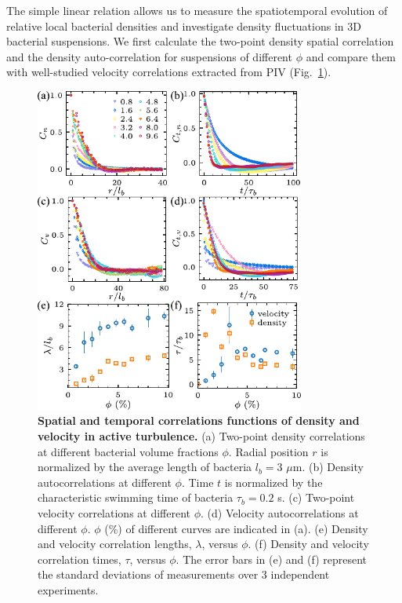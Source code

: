 The simple linear relation allows us to measure the spatiotemporal evolution of relative local bacterial densities and investigate density fluctuations in 3D bacterial suspensions. We first calculate the two-point density spatial correlation and the density auto-correlation for suspensions of different $\phi$ and compare them with well-studied velocity correlations extracted from PIV (Fig.~\ref{fig:spatiotemporal-correlations}).

\begin{figure}[!h]
\begin{center}
\includegraphics[width=3.5in]{figs/5-GNF/3.pdf}
\caption[Spatial and temporal correlation functions in active turbulence]
{
\textbf{Spatial and temporal correlations functions of density and velocity in active turbulence.}
(a) Two-point density correlations at different bacterial volume fractions $\phi$. Radial position $r$ is normalized by the average length of bacteria $l_b = 3$ $\mu$m.
(b) Density autocorrelations at different $\phi$. Time $t$ is normalized by the characteristic swimming time of bacteria $\tau_b = 0.2$ s.
(c) Two-point velocity correlations at different $\phi$.
(d) Velocity autocorrelations at different $\phi$. $\phi$ ($\%$) of different curves are indicated in (a).
(e) Density and velocity correlation lengths, $\lambda$, versus $\phi$.
(f) Density and velocity correlation times, $\tau$, versus $\phi$.
The error bars in (e) and (f) represent the standard deviations of measurements over 3 independent experiments.
}
\label{fig:spatiotemporal-correlations}
\end{center}
\end{figure}

